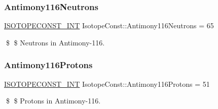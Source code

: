 \subsubsection{\texorpdfstring{Antimony116\+Neutrons}{Antimony116Neutrons}}
{\footnotesize\ttfamily \mbox{\hyperlink{group___isotope_const-_macros_ga5f18360b3e99483a35c32d789e62621c}{I\+S\+O\+T\+O\+P\+E\+C\+O\+N\+S\+T\+\_\+\+I\+NT}} Isotope\+Const\+::\+Antimony116\+Neutrons = 65}

\$ \$ Neutrons in Antimony-\/116. \mbox{\label{group___isotope_const-_antimony-_sb116_gafc02502e5c329a5302b67a5d07e2bb32}} 
\subsubsection{\texorpdfstring{Antimony116\+Protons}{Antimony116Protons}}
{\footnotesize\ttfamily \mbox{\hyperlink{group___isotope_const-_macros_ga5f18360b3e99483a35c32d789e62621c}{I\+S\+O\+T\+O\+P\+E\+C\+O\+N\+S\+T\+\_\+\+I\+NT}} Isotope\+Const\+::\+Antimony116\+Protons = 51}

\$ \$ Protons in Antimony-\/116. 